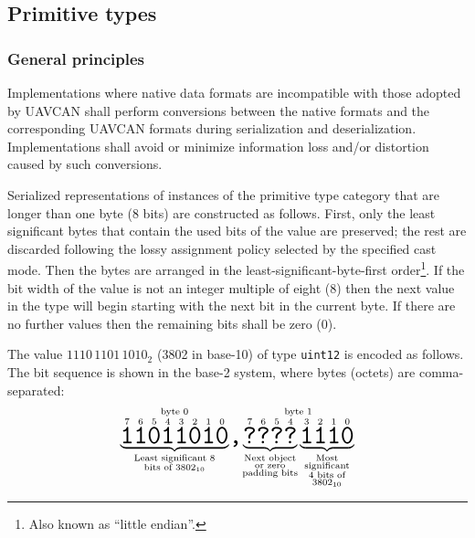 \subsection{Primitive types}

\subsubsection{General principles}

Implementations where native data formats are incompatible with those adopted by UAVCAN shall perform
conversions between the native formats and the corresponding UAVCAN formats during
serialization and deserialization.
Implementations shall avoid or minimize information loss and/or distortion caused by such conversions.

Serialized representations of instances of the primitive type category that are longer than one byte (8 bits)
are constructed as follows.
First, only the least significant bytes that contain the used bits of the value are preserved;
the rest are discarded following the lossy assignment policy selected by the specified cast mode.
Then the bytes are arranged in the least-significant-byte-first order\footnote{Also known as ``little endian''.}.
If the bit width of the value is not an integer multiple of eight (8) then the next value in the type will begin
starting with the next bit in the current byte. If there are no further values then the remaining bits
shall be zero (0).

\begin{remark}
    The value $1110\,1101\,1010_2$ (3802 in base-10) of type \verb|uint12| is encoded as follows.
    The bit sequence is shown in the base-2 system, where bytes (octets) are comma-separated:
    $$
        \overset{\text{byte 0}}{%
            \underbrace{%
                \overset{7}{\hugett{1}}
                \overset{6}{\hugett{1}}
                \overset{5}{\hugett{0}}
                \overset{4}{\hugett{1}}
                \overset{3}{\hugett{1}}
                \overset{2}{\hugett{0}}
                \overset{1}{\hugett{1}}
                \overset{0}{\hugett{0}}
            }_{\substack{\text{Least significant 8} \\ \text{bits of }3802_{10}}}%
        }%
        \hugett{,}%
        \overset{\text{byte 1}}{%
            \underbrace{
                \overset{7}{\hugett{?}}
                \overset{6}{\hugett{?}}
                \overset{5}{\hugett{?}}
                \overset{4}{\hugett{?}}
            }_{\substack{\text{Next object} \\ \text{or zero} \\ \text{padding bits}}}%
            \underbrace{
                \overset{3}{\hugett{1}}
                \overset{2}{\hugett{1}}
                \overset{1}{\hugett{1}}
                \overset{0}{\hugett{0}}
            }_{\substack{\text{Most} \\ \text{significant} \\ \text{4 bits of} \\ \text{3802}_{10}}}%
        }
    $$
\end{remark}

